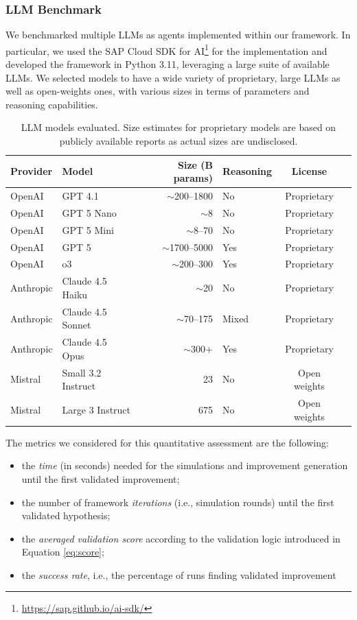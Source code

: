 \documentclass[preprint,12pt]{elsarticle}
\begin{document}
\subsubsection{LLM Benchmark}

We benchmarked multiple LLMs as agents implemented within our framework. In particular, we used the SAP Cloud SDK for AI\footnote{\url{https://sap.github.io/ai-sdk/}} for the implementation and developed the framework in Python 3.11, leveraging a large suite of available LLMs. We selected models to have a wide variety of proprietary, large LLMs as well as open-weights ones, with various sizes in terms of parameters and reasoning capabilities.

\begin{table}[htbp]
\centering
\caption{LLM models evaluated. Size estimates for proprietary models are based on publicly available reports as actual sizes are undisclosed.}
\label{tab:models}
\begin{tabular}{@{}llrlcl@{}}
\toprule
\textbf{Provider} & \textbf{Model} & \textbf{Size (B params)} & \textbf{Reasoning} & \textbf{License} \\
\midrule
OpenAI & GPT 4.1 & $\sim$200--1800 & No & Proprietary \\
OpenAI & GPT 5 Nano & $\sim$8 & No & Proprietary \\
OpenAI & GPT 5 Mini & $\sim$8--70 & No & Proprietary \\
OpenAI & GPT 5 & $\sim$1700--5000 & Yes & Proprietary \\
OpenAI & o3 & $\sim$200--300 & Yes & Proprietary \\
\midrule
Anthropic & Claude 4.5 Haiku & $\sim$20 & No & Proprietary \\
Anthropic & Claude 4.5 Sonnet & $\sim$70--175 & Mixed & Proprietary \\
Anthropic & Claude 4.5 Opus & $\sim$300+ & Yes & Proprietary \\
\midrule
Mistral & Small 3.2 Instruct & 23 & No & Open weights \\
Mistral & Large 3 Instruct & 675 & No & Open weights \\
\bottomrule
\end{tabular}
\end{table}

The metrics we considered for this quantitative assessment are the following:

\begin{itemize}
    \item the \textit{time} (in seconds) needed for the simulations and improvement generation until the first validated improvement;
    \item the number of framework \textit{iterations} (i.e., simulation rounds) until the first validated hypothesis;
    \item the \textit{averaged validation score} according to the validation logic introduced in Equation \ref{eq:score};
    \item the \textit{success rate}, i.e., the percentage of runs finding validated improvement
\end{itemize}
\end{document}
